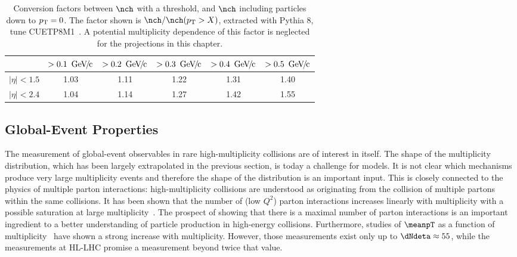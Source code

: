 \documentclass[../report.tex]{subfiles}
\begin{document}
\begin{table}
\centering
\begin{tabular}{c|c|c|c|c|c}
\backslashbox{$|\eta|$}{$\pT$} & $> \unit[0.1]{\UGeVc}$ & $> \unit[0.2]{\UGeVc}$ & $> \unit[0.3]{\UGeVc}$ & $> \unit[0.4]{\UGeVc}$ & $> \unit[0.5]{\UGeVc}$ \\
\hline
$|\eta| < 1.5$ & 1.03 & 1.11 & 1.22 & 1.31 & 1.40 \\
\hline
$|\eta| < 2.4$ & 1.04 & 1.14 & 1.27 & 1.42 & 1.55 \\
\hline
\end{tabular}
\caption{Conversion factors between $\nch$ with a \pT threshold, and $\nch$ including particles down to $p\sb{\scriptstyle\mathrm{T}} = 0$. The factor shown is $\nch / \nch(\pT > X)$, extracted with Pythia 8, tune CUETP8M1~\cite{Khachatryan:2015pea}. A potential multiplicity dependence of this factor is neglected for the projections in this chapter.}
\label{tab:smallsystems_conversion}
\end{table}

\subsection{Global-Event Properties}
\label{sect:smallsystems_global}
  
The measurement of global-event observables in rare high-multiplicity \pp collisions are of interest in itself. The shape of the multiplicity distribution, which has been largely extrapolated in the previous section, is today a challenge for models. It is not clear which mechanisms produce very large multiplicity events and therefore the shape of the distribution is an important input. 
This is closely connected to the physics of multiple parton interactions: high-multiplicity collisions are understood as originating from the collision of multiple partons within the same \pp collisions. It has been shown that the number of (low $Q^2$) parton interactions increases linearly with multiplicity with a possible saturation at large multiplicity~\cite{Abelev:2013sqa}. The prospect of showing that there is a maximal number of parton interactions is an important ingredient to a better understanding of particle production in high-energy \pp collisions.
Furthermore, studies of $\meanpT$ as a function of multiplicity~\cite{Abelev:2013bla} have shown a strong increase with multiplicity. However, those measurements exist only up to $\dNdeta \approx 55$, while the measurements at HL-LHC promise a measurement beyond twice that value. 
\end{document}
